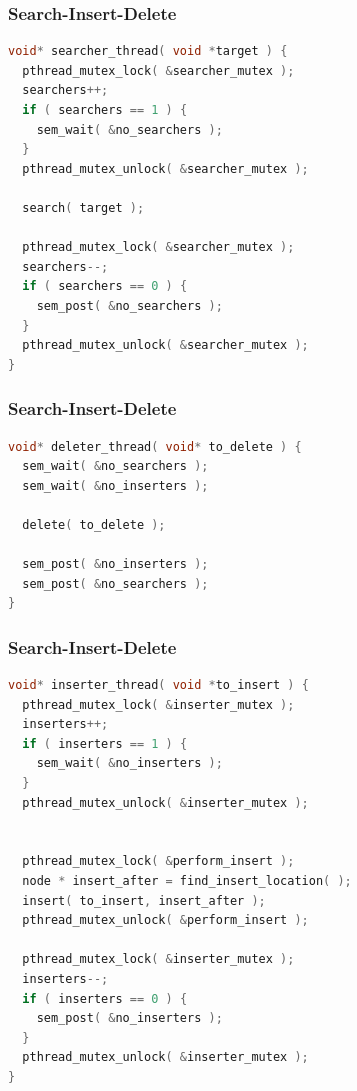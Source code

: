 \begin{frame}[fragile]
	\frametitle{Search-Insert-Delete}
	\begin{lstlisting}[language=C]
void* searcher_thread( void *target ) {
  pthread_mutex_lock( &searcher_mutex );
  searchers++;
  if ( searchers == 1 ) {
    sem_wait( &no_searchers );
  }
  pthread_mutex_unlock( &searcher_mutex );
  
  search( target );
  
  pthread_mutex_lock( &searcher_mutex );
  searchers--;
  if ( searchers == 0 ) {
    sem_post( &no_searchers );
  }
  pthread_mutex_unlock( &searcher_mutex );
}
\end{lstlisting}
\end{frame}

\begin{frame}[fragile]
	\frametitle{Search-Insert-Delete}
	\begin{lstlisting}[language=C]
void* deleter_thread( void* to_delete ) {
  sem_wait( &no_searchers );
  sem_wait( &no_inserters );
  
  delete( to_delete );
  
  sem_post( &no_inserters );
  sem_post( &no_searchers );
}
\end{lstlisting}
\end{frame}

\begin{frame}[fragile]
	\frametitle{Search-Insert-Delete}
	\begin{lstlisting}[language=C]
void* inserter_thread( void *to_insert ) {
  pthread_mutex_lock( &inserter_mutex );
  inserters++;
  if ( inserters == 1 ) {
    sem_wait( &no_inserters );
  }
  pthread_mutex_unlock( &inserter_mutex );
  

  pthread_mutex_lock( &perform_insert );
  node * insert_after = find_insert_location( );
  insert( to_insert, insert_after );
  pthread_mutex_unlock( &perform_insert );
  
  pthread_mutex_lock( &inserter_mutex );
  inserters--;
  if ( inserters == 0 ) {
    sem_post( &no_inserters );
  }
  pthread_mutex_unlock( &inserter_mutex );
}
\end{lstlisting}
\end{frame}



